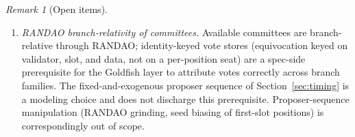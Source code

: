 \ifx\litemode\undefined\documentclass{article}\fi
\theoremstyle{plain}
\theoremstyle{definition}
\theoremstyle{remark}
\newtheorem{remark}[theorem]{Remark}
\begin{document}
\begin{remark}[Open items]
\begin{enumerate}[label=(\arabic*)]
    available-confirmation rule is run and the way its result is stored must be
    compatible with the freeze at which the gates read the safe-confirmed
    head~\(C\) (Definition~\ref{def:conf-gate}).  Under the phase schedule
    (Definition~\ref{def:slots}) confirmation consistency is structural via the
    time-shifted quorum (Definition~\ref{def:goldfish-confirm}); the residual is
    that~\(\Delta\) bounds real delay within each phase
    (Assumption~\ref{ass:heal-delta}).  The interface to \emph{user}
    confirmation is important but secondary here.
  \item \emph{RANDAO branch-relativity of committees.}
    Available committees are branch-relative through RANDAO; identity-keyed vote
    stores (equivocation keyed on validator, slot, and data, not on a
    per-position seat) are a spec-side prerequisite for the Goldfish layer to
    attribute votes correctly across branch families.  The fixed-and-exogenous
    proposer sequence of Section~\ref{sec:timing} is a modeling choice and does
    not discharge this prerequisite.  Proposer-sequence manipulation (RANDAO
    grinding, seed biasing of first-slot positions) is correspondingly out of
    scope.
\end{enumerate}
\end{remark}
\end{document}
